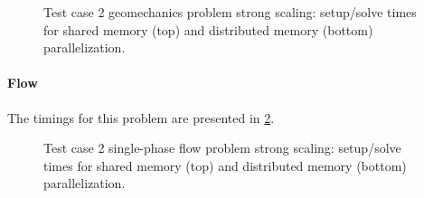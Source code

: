 \begin{figure} [htbp]
  \begin{subfigure}[t]{0.48\textwidth}
    \centering
    
  \end{subfigure}
  \hfill
  \begin{subfigure}[t]{0.48\textwidth}
  \hspace{\textwidth}
  \end{subfigure}
  \begin{subfigure}[t]{0.48\textwidth}
    \centering
    
  \end{subfigure}
  \hfill
  \begin{subfigure}[t]{0.48\textwidth}
    \centering
    
  \end{subfigure}
  \caption[Test case 2 geomechanics problem strong scaling]{Test case 2 geomechanics problem strong scaling: setup/solve times for shared memory (top) and distributed memory (bottom) parallelization.}
  \label{fig:mazumodel2_scaling_strong_mech}
\end{figure}

\paragraph{Flow}
The timings for this problem are presented in \cref{fig:mazumodel2_scaling_strong_flow}.

\begin{figure} [htbp]
  \begin{subfigure}[t]{0.48\textwidth}
    \centering
    
  \end{subfigure}
  \hfill
  \begin{subfigure}[t]{0.48\textwidth}
  \hspace{\textwidth}
  \end{subfigure}
  \begin{subfigure}[t]{0.48\textwidth}
    \centering
    
  \end{subfigure}
  \hfill
  \begin{subfigure}[t]{0.48\textwidth}
    \centering
    
  \end{subfigure}
  \caption[Test case 2 single-phase flow problem strong scaling]{Test case 2 single-phase flow problem strong scaling: setup/solve times for shared memory (top) and distributed memory (bottom) parallelization.}
  \label{fig:mazumodel2_scaling_strong_flow}
\end{figure}

